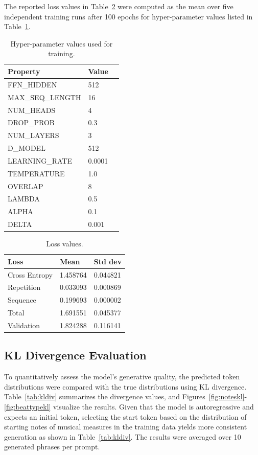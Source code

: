 \documentclass{article}
\begin{document}
The reported loss values in Table~\ref{tab:loss} were computed as the mean over five independent training runs after 100 epochs for 
hyper-parameter values listed in Table~\ref{tab:hyperparam}.

\begin{table}[H]
\centering
  \begin{tabular}{lll}
  \toprule
  \bfseries Property & \bfseries Value \\ \midrule
  FFN\_HIDDEN  & 512 \\
MAX\_SEQ\_LENGTH & 16 \\
NUM\_HEADS & 4 \\
DROP\_PROB & 0.3 \\
NUM\_LAYERS  & 3 \\
D\_MODEL & 512 \\
LEARNING\_RATE & 0.0001 \\
TEMPERATURE  & 1.0 \\
OVERLAP & 8 \\
LAMBDA & 0.5 \\
ALPHA & 0.1 \\
DELTA  & 0.001 \\
  \bottomrule
  \end{tabular}
  \caption{Hyper-parameter values used for training.}
\label{tab:hyperparam}
\end{table}
\begin{table}[H]
\centering
  \begin{tabular}{lll}
  \toprule
  \bfseries Loss & \bfseries Mean & \bfseries Std dev \\ \midrule
  Cross Entropy  & 1.458764  & 0.044821        \\
  Repetition  & 0.033093 &  0.000869        \\
  Sequence  & 0.199693  &  0.000002        \\
  Total  & 1.691551  & 0.045377       \\
  Validation  &  1.824288 & 0.116141    \\
  \bottomrule
  \end{tabular}
  \caption{Loss values.}
\label{tab:loss}
\end{table}

\subsection{KL Divergence Evaluation}
To quantitatively assess the model's generative quality, the predicted token distributions were compared with the true distributions using KL divergence.
Table~\ref{tab:kldiv} summarizes the divergence values, and Figures~\ref{fig:noteskl}-\ref{fig:beattypekl} visualize the results.
Given that the model is autoregressive and expects an initial token, selecting the start token based on the 
distribution of starting notes of musical measures in the training data yields more consistent generation
as shown in Table~\ref{tab:kldiv}. The results were averaged over 10 generated phrases per prompt.
\end{document}
